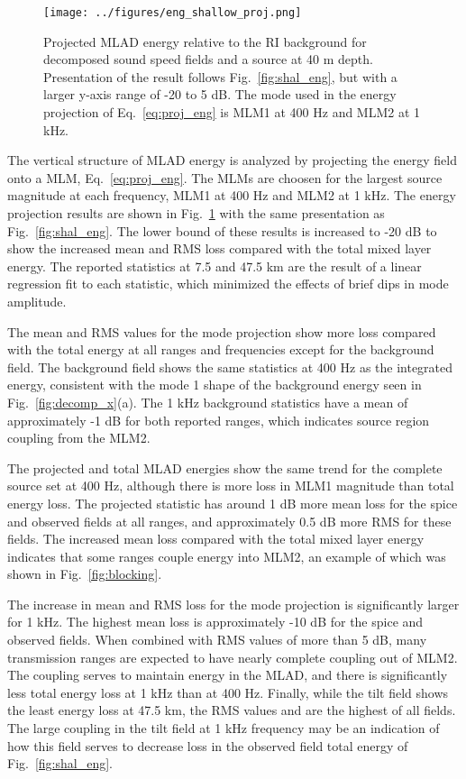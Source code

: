 \documentclass[preprint,NumberedRefs]{JASA}
\begin{document}
\begin{figure}
\texttt{[image: ../figures/eng\_shallow\_proj.png]}
    \caption{Projected MLAD energy relative to the RI background for decomposed sound speed fields and a source at 40 m depth. Presentation of the result follows Fig.~\ref{fig:shal_eng}, but with a larger y-axis range of -20 to 5 dB. The mode used in the energy projection of Eq.~\eqref{eq:proj_eng} is MLM1 at 400 Hz and MLM2 at 1 kHz.}
    \label{fig:shal_proj}
\end{figure}
The vertical structure of MLAD energy is analyzed by projecting the energy field onto a MLM, Eq.~\eqref{eq:proj_eng}. The MLMs are choosen for the largest source magnitude at each frequency, MLM1 at 400 Hz and MLM2 at 1 kHz. The energy projection results are shown in Fig.~\ref{fig:shal_proj} with the same presentation as Fig.~\ref{fig:shal_eng}. The lower bound of these results is increased to -20 dB to show the increased mean and RMS loss compared with the total mixed layer energy. The reported statistics at 7.5 and 47.5 km are the result of a linear regression fit to each statistic, which minimized the effects of brief dips in mode amplitude.

The mean and RMS values for the mode projection show more loss compared with the total energy at all ranges and frequencies except for the background field. The background field shows the same statistics at 400 Hz as the integrated energy, consistent with the mode 1 shape of the background energy seen in Fig.~\ref{fig:decomp_x}(a). The 1 kHz background statistics have a mean of approximately -1 dB for both reported ranges, which indicates source region coupling from the MLM2.

The projected and total MLAD energies show the same trend for the complete source set at 400 Hz, although there is more loss in MLM1 magnitude than total energy loss. The projected statistic has around 1 dB more mean loss for the spice and observed fields at all ranges, and approximately 0.5 dB more RMS for these fields. The increased mean loss compared with the total mixed layer energy indicates that some ranges couple energy into MLM2, an example of which was shown in Fig.~\ref{fig:blocking}.

The increase in mean and RMS loss for the mode projection is significantly larger for 1 kHz. The highest mean loss is approximately -10 dB for the spice and observed fields. When combined with RMS values of more than 5 dB, many transmission ranges are expected to have nearly complete coupling out of MLM2. The coupling serves to maintain energy in the MLAD, and there is significantly less total energy loss at 1 kHz than at 400 Hz. Finally, while the tilt field shows the least energy loss at 47.5 km, the RMS values and are the highest of all fields. The large coupling in the tilt field at 1 kHz frequency may be an indication of how this field serves to decrease loss in the observed field total energy of Fig.~\ref{fig:shal_eng}.
\end{document}
